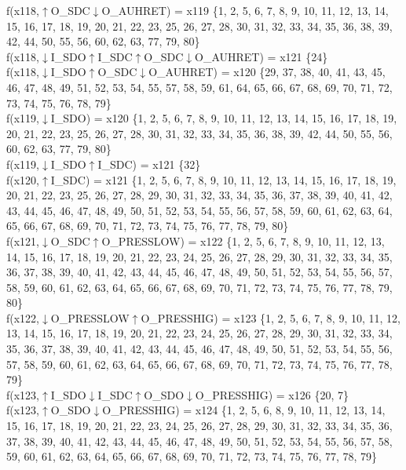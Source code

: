f(x118,$\uparrow$O\_SDC$\downarrow$O\_AUHRET) = x119 \{1, 2, 5, 6, 7, 8, 9, 10, 11, 12, 13, 14, 15, 16, 17, 18, 19, 20, 21, 22, 23, 25, 26, 27, 28, 30, 31, 32, 33, 34, 35, 36, 38, 39, 42, 44, 50, 55, 56, 60, 62, 63, 77, 79, 80\} \\  
f(x118,$\downarrow$I\_SDO$\uparrow$I\_SDC$\uparrow$O\_SDC$\downarrow$O\_AUHRET) = x121 \{24\} \\  
f(x118,$\downarrow$I\_SDO$\uparrow$O\_SDC$\downarrow$O\_AUHRET) = x120 \{29, 37, 38, 40, 41, 43, 45, 46, 47, 48, 49, 51, 52, 53, 54, 55, 57, 58, 59, 61, 64, 65, 66, 67, 68, 69, 70, 71, 72, 73, 74, 75, 76, 78, 79\} \\  
f(x119,$\downarrow$I\_SDO) = x120 \{1, 2, 5, 6, 7, 8, 9, 10, 11, 12, 13, 14, 15, 16, 17, 18, 19, 20, 21, 22, 23, 25, 26, 27, 28, 30, 31, 32, 33, 34, 35, 36, 38, 39, 42, 44, 50, 55, 56, 60, 62, 63, 77, 79, 80\} \\  
f(x119,$\downarrow$I\_SDO$\uparrow$I\_SDC) = x121 \{32\} \\  
f(x120,$\uparrow$I\_SDC) = x121 \{1, 2, 5, 6, 7, 8, 9, 10, 11, 12, 13, 14, 15, 16, 17, 18, 19, 20, 21, 22, 23, 25, 26, 27, 28, 29, 30, 31, 32, 33, 34, 35, 36, 37, 38, 39, 40, 41, 42, 43, 44, 45, 46, 47, 48, 49, 50, 51, 52, 53, 54, 55, 56, 57, 58, 59, 60, 61, 62, 63, 64, 65, 66, 67, 68, 69, 70, 71, 72, 73, 74, 75, 76, 77, 78, 79, 80\} \\  
f(x121,$\downarrow$O\_SDC$\uparrow$O\_PRESSLOW) = x122 \{1, 2, 5, 6, 7, 8, 9, 10, 11, 12, 13, 14, 15, 16, 17, 18, 19, 20, 21, 22, 23, 24, 25, 26, 27, 28, 29, 30, 31, 32, 33, 34, 35, 36, 37, 38, 39, 40, 41, 42, 43, 44, 45, 46, 47, 48, 49, 50, 51, 52, 53, 54, 55, 56, 57, 58, 59, 60, 61, 62, 63, 64, 65, 66, 67, 68, 69, 70, 71, 72, 73, 74, 75, 76, 77, 78, 79, 80\} \\  
f(x122,$\downarrow$O\_PRESSLOW$\uparrow$O\_PRESSHIG) = x123 \{1, 2, 5, 6, 7, 8, 9, 10, 11, 12, 13, 14, 15, 16, 17, 18, 19, 20, 21, 22, 23, 24, 25, 26, 27, 28, 29, 30, 31, 32, 33, 34, 35, 36, 37, 38, 39, 40, 41, 42, 43, 44, 45, 46, 47, 48, 49, 50, 51, 52, 53, 54, 55, 56, 57, 58, 59, 60, 61, 62, 63, 64, 65, 66, 67, 68, 69, 70, 71, 72, 73, 74, 75, 76, 77, 78, 79\} \\  
f(x123,$\uparrow$I\_SDO$\downarrow$I\_SDC$\uparrow$O\_SDO$\downarrow$O\_PRESSHIG) = x126 \{20, 7\} \\  
f(x123,$\uparrow$O\_SDO$\downarrow$O\_PRESSHIG) = x124 \{1, 2, 5, 6, 8, 9, 10, 11, 12, 13, 14, 15, 16, 17, 18, 19, 20, 21, 22, 23, 24, 25, 26, 27, 28, 29, 30, 31, 32, 33, 34, 35, 36, 37, 38, 39, 40, 41, 42, 43, 44, 45, 46, 47, 48, 49, 50, 51, 52, 53, 54, 55, 56, 57, 58, 59, 60, 61, 62, 63, 64, 65, 66, 67, 68, 69, 70, 71, 72, 73, 74, 75, 76, 77, 78, 79\} \\  
